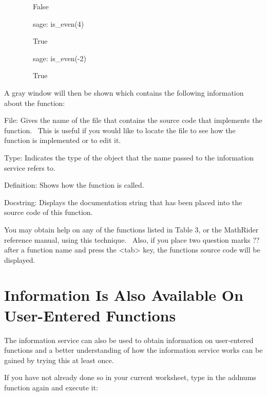 \documentclass[12pt,twoside]{book}
\begin{document}
\ \ \ \ \ \ \ \ False            

\ \ \ \ \ \ \ \ sage: is\_even(4)          

\ \ \ \ \ \ \ \ True            

\ \ \ \ \ \ \ \ sage: is\_even({}-2)         

\ \ \ \ \ \ \ \ True            


\bigskip

A gray window will then be shown which contains the following information about the function: 

\bigskip

File: Gives the name of the file that contains the source code that implements the function. \ This is useful if you would like to locate the file to see how the function is implemented or to edit it. 

\bigskip

Type: Indicates the type of the object that the name passed to the information service refers to.


\bigskip

Definition: Shows how the function is called.


\bigskip

Docstring: Displays the documentation string that has been placed into the source code of this function. 

\bigskip

You may obtain help on any of the functions listed in Table 3, or the MathRider reference manual, using this technique. \ Also, if you place two question marks {\textquotesingle}??{\textquotesingle} after a function name and press the {\textless}tab{\textgreater} key, the function{\textquotesingle}s source code will be displayed.

\section[Information Is Also Available On User{}-Entered Functions]{Information Is Also Available On User{}-Entered Functions}

The information service can also be used to obtain information on user{}-entered functions and a better understanding of how the information service works can be gained by trying this at least once. 

\bigskip

If you have not already done so in your current worksheet, type in the addnums function again and execute it:  

\bigskip
\end{document}
